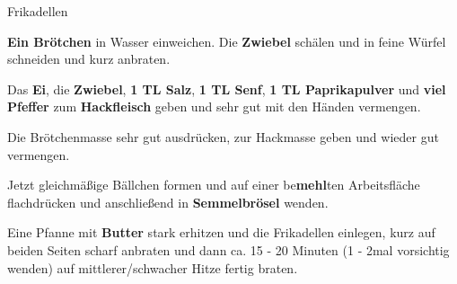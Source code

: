\begin{recipe}[]{Frikadellen} %

\step
\textbf{Ein Brötchen} in Wasser einweichen. Die \textbf{Zwiebel} schälen und in feine Würfel schneiden und kurz anbraten.

\step
Das \textbf{Ei}, die \textbf{Zwiebel}, \textbf{1 TL Salz}, \textbf{1 TL Senf}, \textbf{1 TL Paprikapulver} und \textbf{viel Pfeffer} zum \textbf{Hackfleisch} geben und sehr gut mit den Händen vermengen. 

\step
Die Brötchenmasse sehr gut ausdrücken, zur Hackmasse geben und wieder gut vermengen.

\step
Jetzt gleichmäßige Bällchen formen und auf einer be\textbf{mehl}ten Arbeitsfläche flachdrücken und anschließend in \textbf{Semmelbrösel} wenden. 

\step
Eine Pfanne mit \textbf{Butter} stark erhitzen und die Frikadellen einlegen, kurz auf beiden Seiten scharf anbraten und dann ca. 15 - 20 Minuten (1 - 2mal vorsichtig wenden) auf mittlerer/schwacher Hitze fertig braten.

\end{recipe}